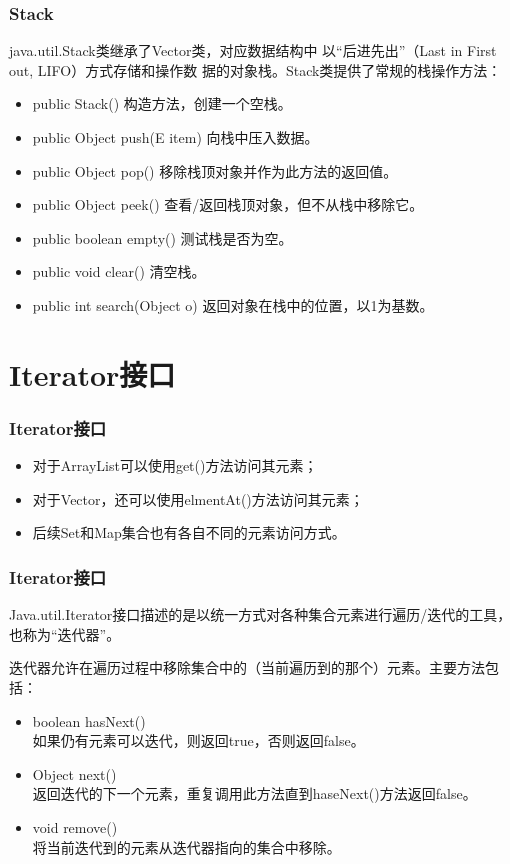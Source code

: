 \begin{frame}[fragile] %
  \frametitle{Stack} java.util.Stack类继承了Vector类，对应数据结构中
  以{\hei\Blue “后进先出”（Last in First out, LIFO）方式存储和操作数
    据的对象栈}。Stack类提供了常规的栈操作方法：

  \begin{itemize}\kai\small
  \item public Stack() 构造方法，创建一个空栈。
  \item public Object push(E item) 向栈中压入数据。
  \item public Object pop() 移除栈顶对象并作为此方法的返回值。
  \item public Object peek() 查看/返回栈顶对象，但不从栈中移除它。
  \item public boolean empty() 测试栈是否为空。
  \item public void clear() 清空栈。
  \item public int search(Object o) 返回对象在栈中的位置，以1为基数。
  \end{itemize}
\end{frame}

\section{Iterator接口}

\begin{frame}[fragile] %
  \frametitle{Iterator接口}

  
  \begin{itemize}
  \item 对于ArrayList可以使用get()方法访问其元素；
  \item 对于Vector，还可以使用elmentAt()方法访问其元素；
  \item 后续Set和Map集合也有各自不同的元素访问方式。
  \end{itemize}

\end{frame}

\begin{frame}[fragile] %
  \frametitle{Iterator接口}

  Java.util.Iterator接口描述的是以统一方式对各种集合元素进行遍历/迭代的工具，也称为“{\Blue\hei 迭代器}”。

  迭代器允许在遍历过程中移除集合中的（当前遍历到的那个）元素。主要方法包括：

  \begin{itemize}\small\kai
  \item boolean hasNext()\\
    如果仍有元素可以迭代，则返回true，否则返回false。
  \item Object next()\\
    返回迭代的下一个元素，重复调用此方法直到haseNext()方法返回false。
  \item void remove()\\
    将当前迭代到的元素从迭代器指向的集合中移除。
  \end{itemize}
\end{frame}

